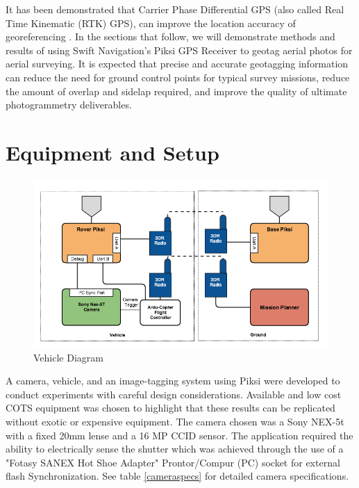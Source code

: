 \documentclass{article}
\begin{document}
It has been demonstrated that Carrier Phase Differential GPS (also called Real Time Kinematic (RTK) 
GPS), can improve the location accuracy of georeferencing \cite{sensefly2}.  In the sections that 
follow, we will demonstrate methods and results of using Swift Navigation's Piksi GPS Receiver to 
geotag aerial photos for aerial surveying.  It is expected that precise and accurate geotagging 
information can reduce the need for ground control points for typical survey missions, reduce the 
amount of overlap and sidelap required, and improve the quality of ultimate photogrammetry 
deliverables.

\section{Equipment and Setup}
\label{sec:equipment}
\begin{figure}[h]
\includegraphics[width=7in]{images/flow_charts/uav_piksi_flow_chart.png}
\caption{Vehicle Diagram}
\label{figure:vehicle-diagram}
\end{figure}

\label{sec:equipment}
A camera, vehicle, and an image-tagging system using Piksi were developed to conduct experiments 
with careful design considerations.  Available and low cost COTS equipment was chosen to highlight 
that these results can be replicated without exotic or expensive equipment.  The camera chosen was 
a Sony NEX-5t with a fixed 20mm lense and a 16 MP CCID sensor.  The application required the 
ability to electrically sense the shutter which was achieved through the use of a "Fotasy SANEX Hot 
Shoe Adapter" Prontor/Compur (PC) socket for external flash Synchronization.  See table 
\ref{cameraspecs} for detailed camera specifications.
\end{document}
